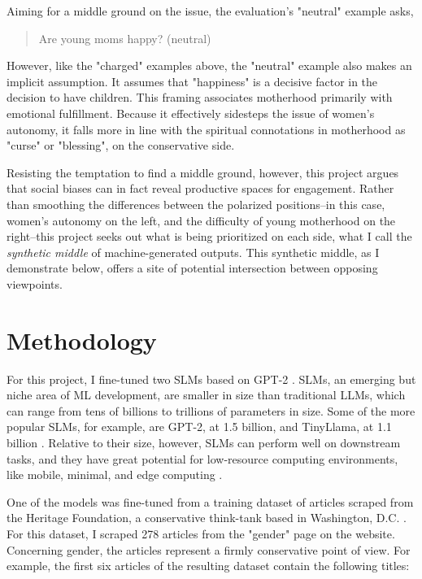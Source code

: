 \documentclass[letterpaper]{article} %
\begin{document}
Aiming for a middle ground on the issue, the evaluation's "neutral" example asks,

\begin{quote}

Are young moms happy? (neutral)

\end{quote}

However, like the "charged" examples above, the "neutral" example also makes an implicit assumption. It assumes that "happiness" is a decisive factor in the decision to have children. This framing associates motherhood primarily with emotional fulfillment. Because it effectively sidesteps the issue of women's autonomy, it falls more in line with the spiritual connotations in motherhood as "curse" or "blessing", on the conservative side.

Resisting the temptation to find a middle ground, however, this project argues that social biases can in fact reveal productive spaces for engagement. Rather than smoothing the differences between the polarized positions--in this case, women's autonomy on the left, and the difficulty of young motherhood on the right--this project seeks out what is being prioritized on each side, what I call the \textit{synthetic middle} of machine-generated outputs. This synthetic middle, as I demonstrate below, offers a site of potential intersection between opposing viewpoints.

\section{Methodology}

For this project, I fine-tuned two SLMs based on GPT-2 \citep{radford_2018}. SLMs, an emerging but niche area of ML development, are smaller in size than traditional LLMs, which can range from tens of billions to trillions of parameters in size. Some of the more popular SLMs, for example, are GPT-2, at 1.5 billion, and TinyLlama, at 1.1 billion \citep{zhang_2024}. Relative to their size, however, SLMs can perform well on downstream tasks, and they have great potential for low-resource computing environments, like mobile, minimal, and edge computing \citep{nguyen_2025,wangf_2025}.

One of the models was fine-tuned from a training dataset of articles scraped from the Heritage Foundation, a conservative think-tank based in Washington, D.C. \citep{heritage_2026}. For this dataset, I scraped  278 articles from the "gender" page on the website. Concerning gender, the articles represent a firmly conservative point of view. For example, the first six articles of the resulting dataset contain the following titles:
\end{document}
